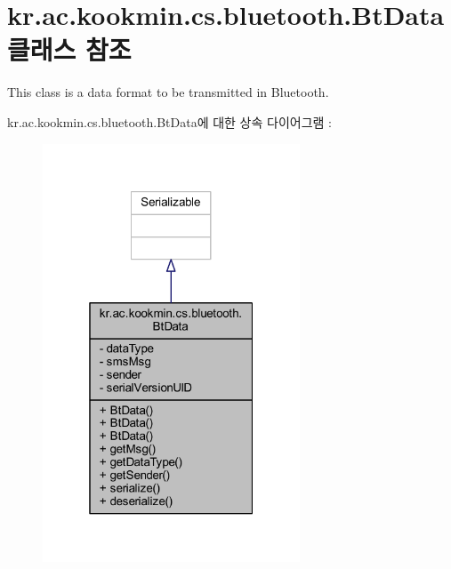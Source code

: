 \hypertarget{classkr_1_1ac_1_1kookmin_1_1cs_1_1bluetooth_1_1_bt_data}{}\section{kr.\+ac.\+kookmin.\+cs.\+bluetooth.\+Bt\+Data 클래스 참조}
\label{classkr_1_1ac_1_1kookmin_1_1cs_1_1bluetooth_1_1_bt_data}


This class is a data format to be transmitted in Bluetooth.  




kr.\+ac.\+kookmin.\+cs.\+bluetooth.\+Bt\+Data에 대한 상속 다이어그램 \+: \nopagebreak
\begin{figure}[H]
\begin{center}
\leavevmode
\includegraphics[width=217pt]{classkr_1_1ac_1_1kookmin_1_1cs_1_1bluetooth_1_1_bt_data__inherit__graph}
\end{center}
\end{figure}



